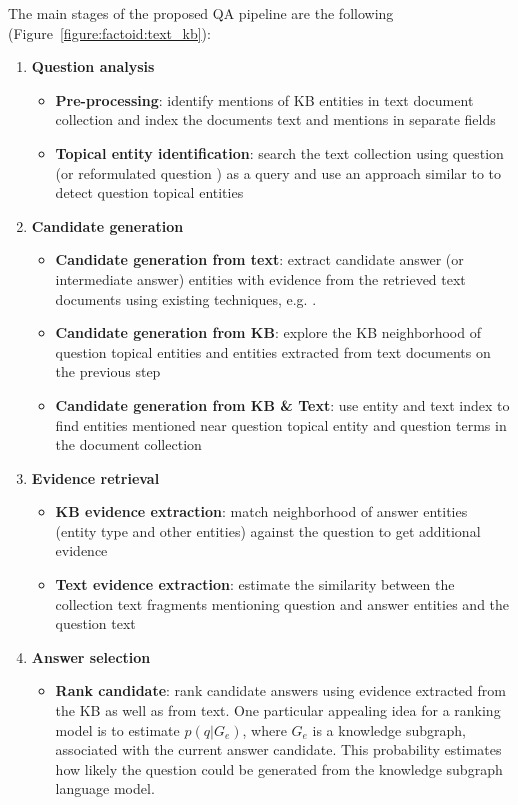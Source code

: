The main stages of the proposed QA pipeline are the following (Figure~\ref{figure:factoid:text_kb}):
\begin{enumerate}
\item \textbf{Question analysis}
	\begin{itemize}
	  \item \textbf{Pre-processing}: identify mentions of KB entities in text document collection and index the documents text and mentions in separate fields
  	  \item \textbf{Topical entity identification}: search the text collection using question (or reformulated question \cite{AgichteinLG01}) as a query and use an approach similar to \cite{cornolti2014smaph} to detect question topical entities
    \end{itemize}
  
\item \textbf{Candidate generation}
	\begin{itemize}
	  \item \textbf{Candidate generation from text}: extract candidate answer (or intermediate answer) entities with evidence from the retrieved text documents using existing techniques, e.g. \cite{tsai2015web}.
  	  \item \textbf{Candidate generation from KB}: explore the KB neighborhood of question topical entities and entities extracted from text documents on the previous step
	  \item \textbf{Candidate generation from KB \& Text}: use entity and text index to find entities mentioned near question topical entity and question terms in the document collection
	\end{itemize}
\item \textbf{Evidence retrieval}
    \begin{itemize}
	  \item \textbf{KB evidence extraction}: match neighborhood of answer entities (entity type and other entities) against the question to get additional evidence
      \item \textbf{Text evidence extraction}: estimate the similarity between the collection text fragments mentioning question and answer entities and the question text
    \end{itemize}
\item \textbf{Answer selection}
	\begin{itemize}
	  \item \textbf{Rank candidate}: rank candidate answers using evidence extracted from the KB as well as from text. One particular appealing idea for a ranking model is to estimate $p(q|G_e)$, where $G_e$ is a knowledge subgraph, associated with the current answer candidate. This probability estimates how likely the question could be generated from the knowledge subgraph language model.
    \end{itemize}
\end{enumerate}

